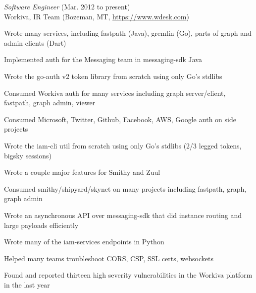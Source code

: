 \documentclass[10pt, a4paper]{article}
\begin{document}
\begin{itemize*}
  \item \emph{Software Engineer} (Mar. 2012 to present)\\
    Workiva, IR Team (Bozeman, MT, \url{https://www.wdesk.com})
    \begin{itemize*}
    \item Wrote many services, including fastpath (Java), gremlin (Go), parts of graph and admin clients (Dart)
    \item Implemented auth for the Messaging team in messaging-sdk Java
    \item Wrote the go-auth v2 token library from scratch using only Go's stdlibs
    \item Consumed Workiva auth for many services including graph server/client, fastpath, graph admin, viewer
    \item Consumed Microsoft, Twitter, Github, Facebook, AWS, Google auth on side projects
    \item Wrote the iam-cli util from scratch using only Go's stdlibs (2/3 legged tokens, bigsky sessions)
    \item Wrote a couple major features for Smithy and Zuul
    \item Consumed smithy/shipyard/skynet on many projects including fastpath, graph, graph admin
    \item Wrote an asynchronous API over messaging-sdk that did instance routing and large payloads efficiently
    \item Wrote many of the iam-services endpoints in Python
    \item Helped many teams troubleshoot CORS, CSP, SSL certs, websockets
    \item Found and reported thirteen high severity vulnerabilities in the Workiva platform in the last year
      

\end{itemize*}
\end{itemize*}
\end{document}
